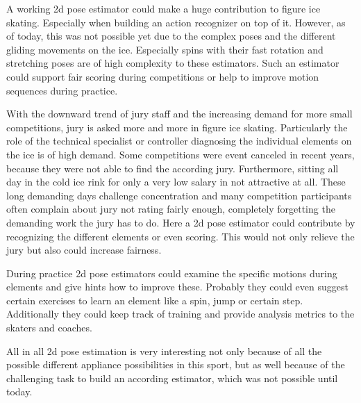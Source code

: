     A working 2d pose estimator could make a huge contribution to figure ice skating.
    Especially when building an action recognizer on top of it.
    However, as of today, this was not possible yet due to the complex poses and the different gliding movements
    on the ice.
    Especially spins with their fast rotation and stretching poses are of high complexity to these estimators.
    Such an estimator could support fair scoring during competitions or help to improve motion sequences during
    practice.\\
    \par
    With the downward trend of jury staff and the increasing demand for more small competitions, jury is asked
    more and more in figure ice skating.
    Particularly the role of the technical specialist or controller diagnosing the individual elements on the ice
    is of high demand.
    Some competitions were event canceled in recent years, because they were not able to find the according jury.
    Furthermore, sitting all day in the cold ice rink for only a very low salary in not attractive at all.
    These long demanding days challenge concentration and many competition participants often complain about jury
    not rating fairly enough,
    completely forgetting the demanding work the jury has to do.
    Here a 2d pose estimator could contribute by recognizing the different elements or even scoring.
    This would not only relieve the jury but also could increase fairness.\\
    \par
    During practice 2d pose estimators could examine the specific motions during elements and give hints how to
    improve these.
    Probably they could even suggest certain exercises to learn an element like a spin, jump or certain step.
    Additionally they could keep track of training and provide analysis metrics to the skaters and coaches.\\
    \par
    All in all 2d pose estimation is very interesting not only because of all the possible different appliance
    possibilities in this sport,
    but as well because of the
    challenging task to build an according estimator, which was not possible until today.



